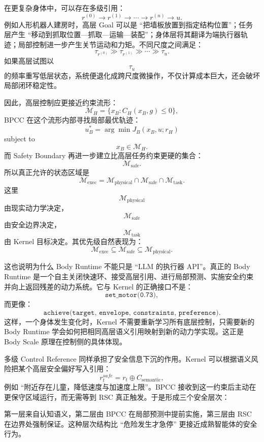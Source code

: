 在更复杂身体中，可以存在多级引用：
\[
r^{(0)}
\rightarrow
r^{(1)}
\rightarrow
\cdots
\rightarrow
r^{(n)}
\rightarrow
u.
\]
例如人形机器人建房时，高层 Goal 可以是 ``把墙板放置到指定结构位置''；任务层产生 ``移动到抓取位置—抓取—运输—装配''；身体层将其翻译为端执行器轨迹；局部控制进一步产生关节运动和力矩。不同尺度之间满足：
\[
\tau_{r^{(0)}}
\gg
\tau_{r^{(1)}}
\gg
\cdots
\gg
\tau_u.
\]
如果高层试图以
\[
\tau_u
\]
的频率重写低层状态，系统便退化成跨尺度微操作，不仅计算成本巨大，还会破坏局部闭环稳定性。

因此，高层控制应更接近约束流形：
\[
\mathcal M_H
=
\{
x_B:
C_H(x_B,g)\leq0
\},
\]
BPCC 在这个流形内部寻找局部最优轨迹：
\[
u_B^*
=
\arg\min
J_B(x_B,u;r_H)
\]
subject to
\[
x_B\in\mathcal M_H.
\]
而 Safety Boundary 再进一步建立比高层任务约束更硬的集合：
\[
\mathcal M_{\mathrm{safe}}.
\]
所以真正允许的状态区域是
\[
\boxed{
\mathcal M_{\mathrm{exec}}
=
\mathcal M_{\mathrm{physical}}
\cap
\mathcal M_{\mathrm{safe}}
\cap
\mathcal M_{\mathrm{task}}.
}
\]
这里
\[
\mathcal M_{\mathrm{physical}}
\]
由现实动力学决定，
\[
\mathcal M_{\mathrm{safe}}
\]
由安全边界决定，
\[
\mathcal M_{\mathrm{task}}
\]
由 Kernel 目标决定。其优先级自然表现为：
\[
\mathcal M_{\mathrm{exec}}
\subseteq
\mathcal M_{\mathrm{safe}}
\subseteq
\mathcal M_{\mathrm{physical}}.
\]

这也说明为什么 Body Runtime 不能只是 ``LLM 的执行器 API''。真正的 Body Runtime 是一个自主关闭快速环、接受高层引用、进行局部预测、实施安全约束并向上返回残差的动力系统。它与 Kernel 的正确接口不是：
\[
\texttt{set\_motor(0.73)},
\]
而更像：
\[
\texttt{achieve(target, envelope, constraints, preference)}.
\]
这样，一个身体发生变化时，Kernel 不需要重新学习所有底层控制，只需要新的 Body Runtime 学会如何把相同高层语义引用映射到新的动力学实现。这正是 Body Scale 原理在控制侧的具体体现。

多级 Control Reference 同样承担了安全信息下沉的作用。Kernel 可以根据语义风险把某个高层安全偏好写入引用：
\[
r_t^{safe}
=
r_t
\oplus
C_{\mathrm{semantic}},
\]
例如 ``附近存在儿童，降低速度与加速度上限''。BPCC 接收到这一约束后主动在更保守区域运行，而无需等到 RSC 真正触发。于是形成三个安全层次：
\begin{statementbox}
\centering
{}
\end{statementbox}
第一层来自认知语义，第二层由 BPCC 在局部预测中提前实施，第三层由 RSC 在边界处强制保证。这种层次结构比 ``危险发生才急停'' 更接近成熟智能体的安全行为。

